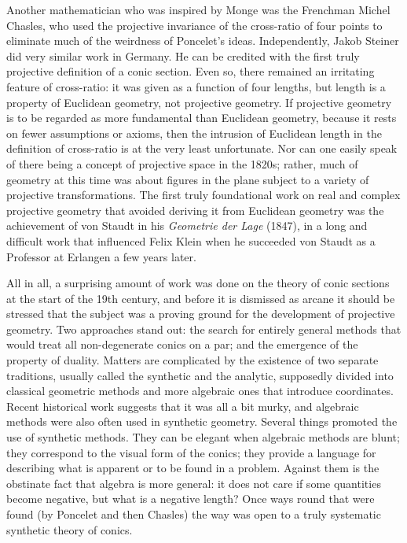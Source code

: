 \documentclass[11pt]{article}
\begin{document}
Another mathematician who was inspired by Monge was the Frenchman Michel Chasles, who used the projective invariance of the cross-ratio of four points to eliminate much of the weirdness of Poncelet's ideas. Independently, Jakob Steiner did very similar work in Germany. He can be credited with the first truly projective definition of a conic section. Even so, there remained an irritating feature of cross-ratio: it was given as a function of four lengths, but length is a property of Euclidean geometry, not projective geometry.  If projective geometry is to be regarded as more fundamental than Euclidean geometry, because it rests on fewer assumptions or axioms, then the intrusion of Euclidean length in the definition of cross-ratio is at the very least unfortunate. Nor can one easily speak of there being a concept of projective space in the 1820s; rather, much of geometry at this time was about figures in the plane subject to a variety of projective transformations. The first truly foundational work on real and complex projective geometry that avoided deriving it from Euclidean geometry was the achievement of von Staudt in his \emph{Geometrie der Lage} (1847), in a long and difficult work that influenced Felix Klein when he succeeded von Staudt as a Professor at Erlangen a few years later. 

All in all, a surprising amount of work was done on the theory of conic sections  at the start of the 19th century, and before it is dismissed as arcane it should be stressed that the subject was a proving ground for the development of projective geometry. Two approaches stand out: the search for entirely  general methods that would treat all non-degenerate conics on a par; and the emergence of the property of duality. Matters are complicated by the existence of two separate traditions, usually called the synthetic and the analytic, supposedly divided into classical geometric methods and more algebraic ones that introduce coordinates. 
Recent historical work suggests that it was all a bit murky, and algebraic methods were also often used in synthetic geometry. Several things promoted the use of synthetic methods. They can be elegant when algebraic methods are blunt; they correspond to the visual form of the conics; they provide a language for describing what is apparent or to be found in a problem. Against them is the obstinate fact that algebra is more general: it does not care if some quantities become negative, but what is a negative length? Once ways round that were found (by Poncelet and then Chasles) the way was open to a truly systematic synthetic theory of conics.   
\end{document}
